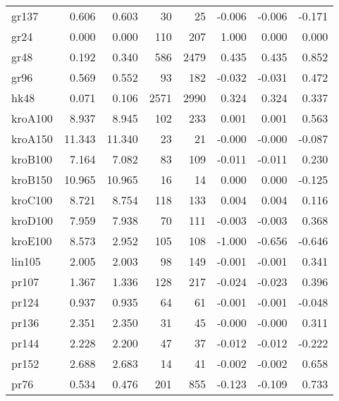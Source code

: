 \begin{tabular}{lrrrrrrr}
    gr137 &     0.606 &     0.603 &          30 &          25 &  -0.006 &   -0.006 &        -0.171 \\
     gr24 &     0.000 &     0.000 &         110 &         207 &   1.000 &    0.000 &         0.000 \\
     gr48 &     0.192 &     0.340 &         586 &        2479 &   0.435 &    0.435 &         0.852 \\
     gr96 &     0.569 &     0.552 &          93 &         182 &  -0.032 &   -0.031 &         0.472 \\
     hk48 &     0.071 &     0.106 &        2571 &        2990 &   0.324 &    0.324 &         0.337 \\
  kroA100 &     8.937 &     8.945 &         102 &         233 &   0.001 &    0.001 &         0.563 \\
  kroA150 &    11.343 &    11.340 &          23 &          21 &  -0.000 &   -0.000 &        -0.087 \\
  kroB100 &     7.164 &     7.082 &          83 &         109 &  -0.011 &   -0.011 &         0.230 \\
  kroB150 &    10.965 &    10.965 &          16 &          14 &   0.000 &    0.000 &        -0.125 \\
  kroC100 &     8.721 &     8.754 &         118 &         133 &   0.004 &    0.004 &         0.116 \\
  kroD100 &     7.959 &     7.938 &          70 &         111 &  -0.003 &   -0.003 &         0.368 \\
  kroE100 &     8.573 &     2.952 &         105 &         108 &  -1.000 &   -0.656 &        -0.646 \\
   lin105 &     2.005 &     2.003 &          98 &         149 &  -0.001 &   -0.001 &         0.341 \\
    pr107 &     1.367 &     1.336 &         128 &         217 &  -0.024 &   -0.023 &         0.396 \\
    pr124 &     0.937 &     0.935 &          64 &          61 &  -0.001 &   -0.001 &        -0.048 \\
    pr136 &     2.351 &     2.350 &          31 &          45 &  -0.000 &   -0.000 &         0.311 \\
    pr144 &     2.228 &     2.200 &          47 &          37 &  -0.012 &   -0.012 &        -0.222 \\
    pr152 &     2.688 &     2.683 &          14 &          41 &  -0.002 &   -0.002 &         0.658 \\
     pr76 &     0.534 &     0.476 &         201 &         855 &  -0.123 &   -0.109 &         0.733 \\

\end{tabular}
